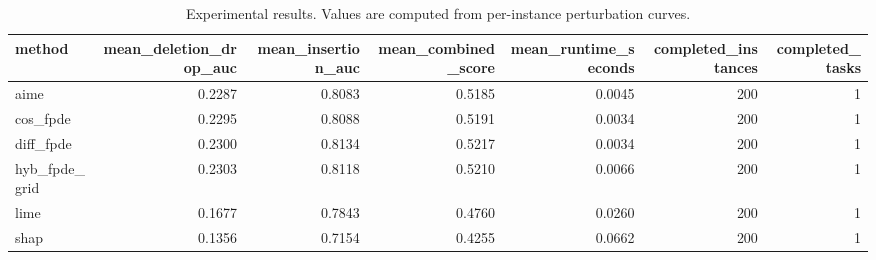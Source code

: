 \begin{table}[t]
\caption{Experimental results. Values are computed from per-instance perturbation curves.}
\label{tab:main_results_computed}
\centering
\begin{tabular}{lrrrrrr}
\toprule
method & mean\_deletion\_drop\_auc & mean\_insertion\_auc & mean\_combined\_score & mean\_runtime\_seconds & completed\_instances & completed\_tasks \\
\midrule
aime & 0.2287 & 0.8083 & 0.5185 & 0.0045 & 200 & 1 \\
cos\_fpde & 0.2295 & 0.8088 & 0.5191 & 0.0034 & 200 & 1 \\
diff\_fpde & 0.2300 & 0.8134 & 0.5217 & 0.0034 & 200 & 1 \\
hyb\_fpde\_grid & 0.2303 & 0.8118 & 0.5210 & 0.0066 & 200 & 1 \\
lime & 0.1677 & 0.7843 & 0.4760 & 0.0260 & 200 & 1 \\
shap & 0.1356 & 0.7154 & 0.4255 & 0.0662 & 200 & 1 \\
\bottomrule
\end{tabular}

\end{table}
